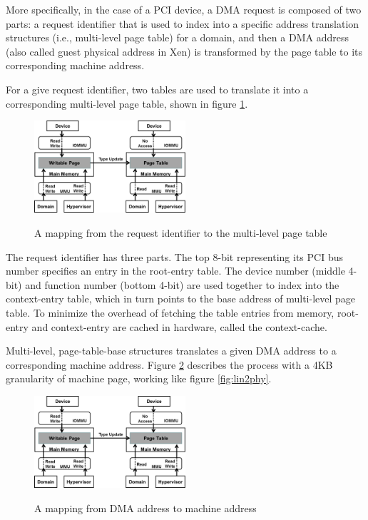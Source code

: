 More specifically, in the case of a PCI device, a DMA request is composed of two parts: a request identifier that is used to index into a specific address translation structures (i.e., multi-level page table) for a domain, and then a DMA address (also called guest physical address in Xen) is transformed by the page table to its corresponding machine address.

For a give request identifier, two tables are used to translate it into a corresponding multi-level page table, shown in figure \ref{fig: dev2dom}.

\begin{figure}[ht]
\centering
\includegraphics[width=0.5\textwidth]{image/background/dev2dom.png} \\
\caption{A mapping from the request identifier to the multi-level page table}
\label{fig: dev2dom}
\end{figure}

The request identifier has three parts. The top 8-bit representing its PCI bus number specifies an entry in the root-entry table. The device number (middle 4-bit) and function number (bottom 4-bit) are used together to index into the context-entry table, which in turn points to the base address of multi-level page table. To minimize the overhead of fetching the table entries from memory, root-entry and context-entry are cached in hardware, called the context-cache.

Multi-level, page-table-base structures translates a given DMA address to a corresponding machine address. Figure \ref{fig: gpa2ma} describes the process with a 4KB granularity of machine page, working like figure \ref{fig:lin2phy}.

\begin{figure}[ht]
\centering
\includegraphics[width=0.5\textwidth]{image/background/gpa2ma.png} \\
\caption{A mapping from DMA address to machine address}
\label{fig: gpa2ma}
\end{figure}

